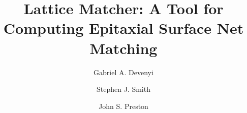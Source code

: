 \documentclass[final,5p,times,twocolumn]{elsarticle}
\begin{document}
\begin{frontmatter}



\title{Lattice Matcher: A Tool for Computing Epitaxial Surface Net Matching}


\author{Gabriel A. Devenyi}
\author{Stephen J. Smith}
\author{John S. Preston}

\address{Department of Engineering Physics, McMaster University, Hamilton, ON, Canada}

\begin{abstract}

\end{abstract}

\begin{keyword}



\end{keyword}

\end{frontmatter}


\end{document}
